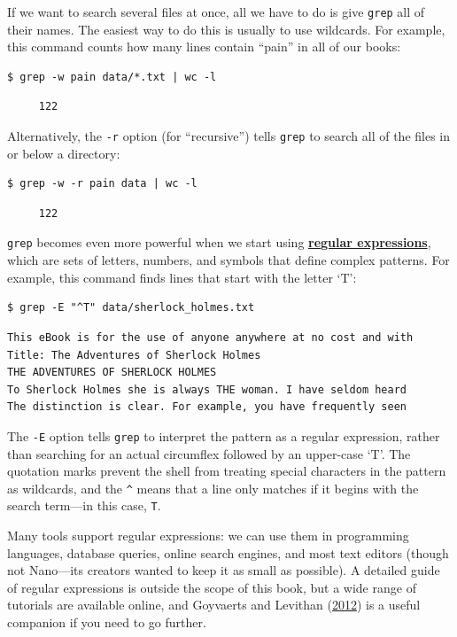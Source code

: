 \documentclass[
]{krantz}
\newcommand{\gref}[2]{\hyperlink{#2}{\textbf{#1}}}
\begin{document}
If we want to search several files at once,
all we have to do is give \texttt{grep} all of their names.
The easiest way to do this is usually to use wildcards.
For example,
this command counts how many lines contain ``pain'' in all of our books:

\begin{verbatim}
$ grep -w pain data/*.txt | wc -l
\end{verbatim}

\begin{verbatim}
     122
\end{verbatim}

Alternatively,
the \texttt{-r} option (for ``recursive'') tells \texttt{grep} to search all of the files
in or below a directory:

\begin{verbatim}
$ grep -w -r pain data | wc -l
\end{verbatim}

\begin{verbatim}
     122
\end{verbatim}

\texttt{grep} becomes even more powerful
when we start using \gref{regular expressions}{regular\_expression},
which are sets of letters, numbers, and symbols that define complex patterns.
For example,
this command finds lines that start with the letter `T':

\begin{verbatim}
$ grep -E "^T" data/sherlock_holmes.txt
\end{verbatim}

\begin{verbatim}
This eBook is for the use of anyone anywhere at no cost and with
Title: The Adventures of Sherlock Holmes
THE ADVENTURES OF SHERLOCK HOLMES
To Sherlock Holmes she is always THE woman. I have seldom heard
The distinction is clear. For example, you have frequently seen
\end{verbatim}

The \texttt{-E} option tells \texttt{grep} to interpret the pattern as a regular expression,
rather than searching for an actual circumflex followed by an upper-case `T'.
The quotation marks prevent the shell from treating special characters in the pattern as wildcards,
and the \texttt{\^{}} means that a line only matches
if it begins with the search term---in this case, \texttt{T}.

Many tools support regular expressions:
we can use them in programming languages,
database queries,
online search engines,
and most text editors (though not Nano---its creators wanted to keep it as small as possible).
A detailed guide of regular expressions is outside the scope of this book,
but a wide range of tutorials are available online,
and Goyvaerts and Levithan (\protect\hyperlink{ref-Goyv2012}{2012}) is a useful companion if you need to go further.
\end{document}
